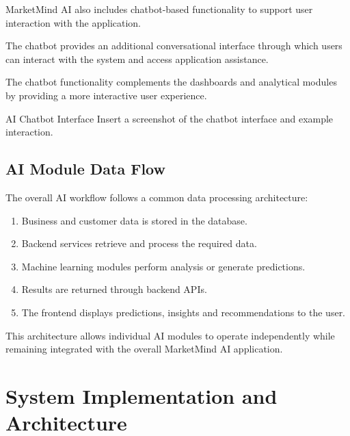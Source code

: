 \documentclass[12pt,a4paper]{report}
\begin{document}
MarketMind AI also includes chatbot-based functionality to support
user interaction with the application.

The chatbot provides an additional conversational interface through
which users can interact with the system and access application
assistance.

The chatbot functionality complements the dashboards and analytical
modules by providing a more interactive user experience.

\begin{screenshotplaceholder}{AI Chatbot Interface}
Insert a screenshot of the chatbot interface and example interaction.
\end{screenshotplaceholder}


\section{AI Module Data Flow}

The overall AI workflow follows a common data processing architecture:

\begin{enumerate}
    \item Business and customer data is stored in the database.
    \item Backend services retrieve and process the required data.
    \item Machine learning modules perform analysis or generate
    predictions.
    \item Results are returned through backend APIs.
    \item The frontend displays predictions, insights and
    recommendations to the user.
\end{enumerate}

This architecture allows individual AI modules to operate independently
while remaining integrated with the overall MarketMind AI application.



\chapter{System Implementation and Architecture}
\end{document}
